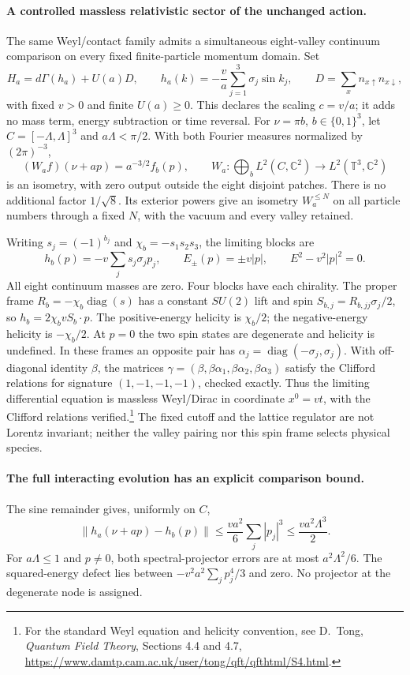 \paragraph{A controlled massless relativistic sector of the unchanged action.}
The same Weyl/contact family admits a simultaneous eight-valley continuum
comparison on every fixed finite-particle momentum domain.  Set
\[
 H_a=d\Gamma(h_a)+U(a)D,\qquad
 h_a(k)=-\frac va\sum_{j=1}^3\sigma_j\sin k_j,
 \qquad D=\sum_x n_{x\uparrow}n_{x\downarrow},
\]
with fixed $v>0$ and finite $U(a)\ge0$.  This declares the scaling $c=v/a$;
it adds no mass term, energy subtraction or time reversal.  For
$\nu=\pi b$, $b\in\{0,1\}^3$, let $C=[-\Lambda,\Lambda]^3$ and
$a\Lambda<\pi/2$.  With both Fourier measures normalized by $(2\pi)^{-3}$,
\[
 (W_af)(\nu+ap)=a^{-3/2}f_b(p),\qquad
 W_a:\bigoplus_b L^2(C,\mathbb C^2)\longrightarrow
 L^2(\mathbb T^3,\mathbb C^2)
\]
is an isometry, with zero output outside the eight disjoint patches.
There is no additional factor $1/\sqrt8$.  Its exterior powers give an
isometry $W_a^{\le N}$ on all particle numbers through a fixed $N$, with
the vacuum and every valley retained.

Writing $s_j=(-1)^{b_j}$ and $\chi_b=-s_1s_2s_3$, the limiting blocks are
\[
 h_b(p)=-v\sum_j s_j\sigma_jp_j,
 \qquad E_\pm(p)=\pm v|p|,
 \qquad E^2-v^2|p|^2=0.
\]
All eight continuum masses are zero.  Four blocks have each chirality.
The proper frame $R_b=-\chi_b\operatorname{diag}(s)$ has a constant
$SU(2)$ lift and spin $S_{b,j}=R_{b,jj}\sigma_j/2$, so
$h_b=2\chi_bv S_b\cdot p$.  The positive-energy helicity is $\chi_b/2$;
the negative-energy helicity is $-\chi_b/2$.  At $p=0$ the two spin states
are degenerate and helicity is undefined.  In these frames an opposite
pair has $\alpha_j=\operatorname{diag}(-\sigma_j,\sigma_j)$.
With off-diagonal identity $\beta$, the matrices
$\gamma=(\beta,\beta\alpha_1,\beta\alpha_2,\beta\alpha_3)$ satisfy the
Clifford relations for signature $(1,-1,-1,-1)$, checked exactly.
Thus the limiting differential equation is massless Weyl/Dirac in
coordinate $x^0=vt$, with the Clifford relations verified.\footnote{For
the standard Weyl equation and helicity convention, see D.~Tong,
\emph{Quantum Field Theory}, Sections 4.4 and 4.7,
\url{https://www.damtp.cam.ac.uk/user/tong/qft/qfthtml/S4.html}.}
The fixed cutoff and the lattice regulator are not Lorentz invariant;
neither the valley pairing nor this spin frame selects physical species.

\paragraph{The full interacting evolution has an explicit comparison bound.}
The sine remainder gives, uniformly on $C$,
\[
 \|h_a(\nu+ap)-h_b(p)\|
 \le\frac{va^2}{6}\sum_j|p_j|^3
 \le\frac{va^2\Lambda^3}{2}.
\]
For $a\Lambda\le1$ and $p\ne0$, both spectral-projector errors are at
most $a^2\Lambda^2/6$.  The squared-energy defect lies between
$-v^2a^2\sum_jp_j^4/3$ and zero.  No projector at the degenerate node
is assigned.

